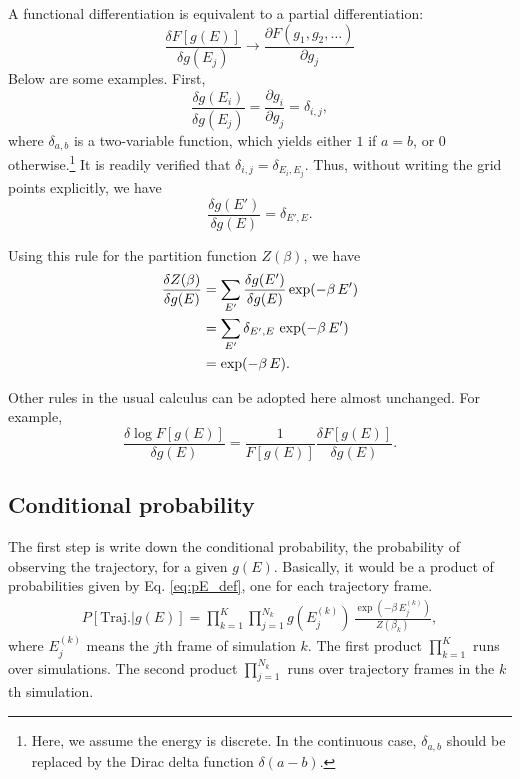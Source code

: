 \documentclass[aip,jcp,preprint,superscriptaddress]{revtex4-1}
\begin{document}
A functional differentiation is
equivalent to a partial differentiation:
%
\begin{equation}
\frac{ \delta F[g(E)]}
     { \delta g(E_j) }
\rightarrow
\frac{ \partial F(g_1, g_2, \dots) }
     { \partial g_j }
\end{equation}
%
Below are some examples.
%
First,
%
\begin{equation}
\frac{ \delta g(E_i) }
     { \delta g(E_j) }
=
\frac{ \partial g_i }
     { \partial g_j }
=
\delta_{i, j},
\end{equation}
%
where $\delta_{a, b}$
is a two-variable function,
which yields either $1$ if $a = b$,
or $0$ otherwise.\footnote{
%
Here, we assume the energy is discrete.
In the continuous case,
$\delta_{a, b}$
should be replaced by the Dirac delta function
$\delta(a - b)$.
%
}
%
It is readily verified that
$\delta_{i, j} = \delta_{E_i, E_j}$.
%
Thus,
without writing the grid points explicitly, we have
\begin{equation}
\frac{ \delta g(E') }
     { \delta g(E) }
=
\delta_{E', E}.
\label{eq:funcdiff_g}
\end{equation}



Using this rule for the partition function $Z(\beta)$,
we have
\begin{align}
\frac{ \delta Z(\beta) }
     { \delta g(E) }
&=
\sum_{E'}
\frac{ \delta g(E') }
     { \delta g(E) }
\exp(-\beta \, E')
\notag \\
&=
\sum_{E'} \delta_{E', E} \, \exp(-\beta \, E')
\notag \\
&= \exp(-\beta \, E).
\label{eq:funcdiff_Z}
\end{align}




Other rules in the usual calculus
can be adopted here almost unchanged.
%
For example,
\begin{equation}
\frac{ \delta \log F[g(E)] }
     { \delta g(E) }
=
\frac{ 1 } { F[g(E)] }
\frac{ \delta F[g(E)] }
     { \delta g(E) }.
\label{eq:funcdiff_logF}
\end{equation}




\subsection{Conditional probability}



The first step is write down the conditional probability,
the probability of observing the trajectory,
for a given $g(E)$.
%
Basically,
it would be a product of
probabilities given by Eq. \eqref{eq:pE_def},
one for each trajectory frame.
%
\begin{align}
P[\mathrm{Traj.}|g(E)]
=
\prod_{k = 1}^K
\prod_{j = 1}^{N_k}
g(E^{(k)}_j) \, \frac{ \exp(-\beta \, E^{(k)}_j) } { Z(\beta_k) },
\label{eq:Pg_cond}
\end{align}
%
where
$E^{(k)}_j$
means the $j$th frame of simulation $k$.
%
The first product $\prod_{k=1}^K$
runs over simulations.
%
The second product $\prod_{j=1}^{N_k}$
runs over trajectory frames in the $k$th simulation.
\end{document}
